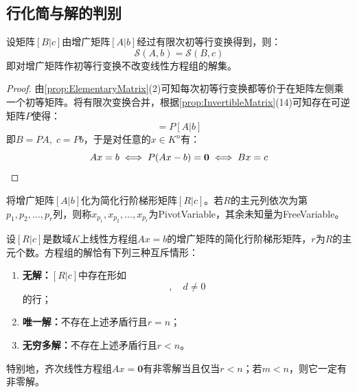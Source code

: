 \subsection{行化简与解的判别}
\begin{property}\label{prop:SLEElementaryRowOperation}
	设矩阵$[B|c]$由增广矩阵$[A|b]$经过有限次初等行变换得到，则：
	\begin{equation*}
		\mathcal{S}(A,b)=\mathcal{S}(B,c) 
	\end{equation*}
	即对增广矩阵作初等行变换不改变线性方程组的解集。
\end{property}
\begin{proof}
	由\cref{prop:ElementaryMatrix}(2)可知每次初等行变换都等价于在矩阵左侧乘一个初等矩阵。将有限次变换合并，根据\cref{prop:InvertibleMatrix}(14)可知存在可逆矩阵$P$使得：
	\begin{equation*}
		[B|c]=P[A|b]
	\end{equation*}
	即$B=PA,\;c=Pb$，于是对任意的$x\in K^n$有：
	\begin{equation*}
		Ax=b\iff P(Ax-b)=\mathbf{0}\iff Bx=c\qedhere
	\end{equation*}
\end{proof}
\begin{definition}
	将增广矩阵$[A|b]$化为简化行阶梯形矩阵$[R|c]$。若$R$的主元列依次为第$p_1,p_2,\dots,p_r$列，则称$x_{p_1},x_{p_2},\dots,x_{p_r}$为\gls{PivotVariable}，其余未知量为\gls{FreeVariable}。
\end{definition}
\begin{theorem}\label{theo:SolutionOfSLE1}
	设$[R|c]$是数域$K$上线性方程组$Ax=b$的增广矩阵的简化行阶梯形矩阵，$r$为$R$的主元个数。方程组的解恰有下列三种互斥情形：
	\begin{enumerate}
		\item \textbf{无解：}$[R|c]$中存在形如
		\begin{equation*}
			[0\ \ 0\ \ \cdots\ \ 0\mid d],\quad d\ne0
		\end{equation*}
		的行；
		\item \textbf{唯一解：}不存在上述矛盾行且$r=n$；
		\item \textbf{无穷多解：}不存在上述矛盾行且$r<n$。
	\end{enumerate}
	特别地，齐次线性方程组$Ax=\mathbf{0}$有非零解当且仅当$r<n$；若$m<n$，则它一定有非零解。
\end{theorem}
